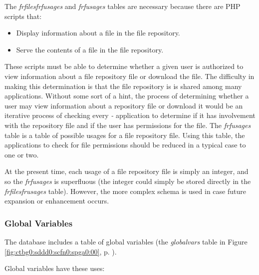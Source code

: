 The \emph{frfilesfrfusages} and \emph{frfusages} tables are necessary because
there are PHP scripts that:

\begin{itemize}
\item Display information about a file in the file repository.
\item Serve the contents of a file in the file repository.
\end{itemize}

These scripts must be able to determine whether a given user is authorized to
view information about a file repository file or download the file.
The difficulty in making this determination is that the file repository is
is shared among many applications.  Without some sort of a hint, the process
of determining whether a user may view information about a repository file
or download it would be an iterative process of checking every
\emph{\productbasename{}-\productversion{}} application to determine if it
has involvement with the repository file and if the user has permissions for the
file.  The \emph{frfusages} table is a table of possible usages for a file 
repository file.  Using this table, the applications to check for file permissions
should be reduced in a typical case to one or two.

At the present time, each usage of a file repository file is simply
an integer, and so the \emph{frfusages} is superfluous (the integer could
simply be stored directly in the \emph{frfilesfrusages} table).  However,
the more complex schema is used in case future expansion or enhancement 
occurs.


\subsubsection{Global Variables}
\label{ctbg0:sddd0:scfn0:sgvr0}

The database includes a table of global variables 
(the \emph{globalvars} table in Figure \ref{fig:ctbg0:sddd0:scfn0:spga0:00},
p. \pageref{fig:ctbg0:sddd0:scfn0:spga0:00}).

Global variables have these uses:


